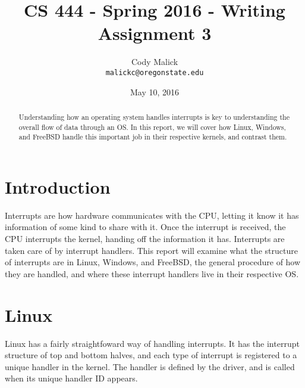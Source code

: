 

% 
  \begin{titlepage}
    \title{CS 444 - Spring 2016 - Writing Assignment 3}
    \author{Cody Malick\\
    \texttt{malickc@oregonstate.edu}}
    \date{May 10, 2016}
    \maketitle
    \vspace*{4cm}
    \begin{abstract}
      \noindent Understanding how an operating system handles interrupts is key
      to understanding the overall flow of data through an OS. In this report,
      we will cover how Linux, Windows, and FreeBSD handle this important job
      in their respective kernels, and contrast them.
    \end{abstract}
  \end{titlepage}

  \tableofcontents
  \clearpage
  \section{Introduction}
  Interrupts are how hardware communicates with the CPU, letting it know it
  has information of some kind to share with it. Once the interrupt is received,
  the CPU interrupts the kernel, handing off the information it has. Interrupts
  are taken care of by interrupt handlers. This report will examine what the structure of
  interrupts are in Linux, Windows, and FreeBSD, the general procedure of
  how they are handled, and where these interrupt handlers live in their
  respective OS.
  \section{Linux}
  Linux has a fairly straightfoward way of handling interrupts. It has the interrupt
  structure of top and bottom halves, and each type of interrupt is registered
  to a unique handler in the kernel. The handler is defined by the driver, and
  is called when its unique handler ID appears.

